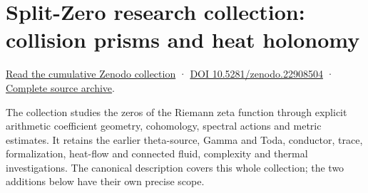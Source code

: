 \documentclass[
]{article}
\author{}
\date{}
\begin{document}
\section{Split-Zero research collection: collision prisms and heat
holonomy}\label{split-zero-research-collection-collision-prisms-and-heat-holonomy}

\href{https://zenodo.org/records/22908504}{Read the cumulative Zenodo
collection} · \href{https://doi.org/10.5281/zenodo.22908504}{DOI
10.5281/zenodo.22908504} ·
\href{https://zenodo.org/records/22908504/files/161-splitzero-prism-holonomy-complete-sources.zip?download=1}{Complete
source archive}.

The collection studies the zeros of the Riemann zeta function through
explicit arithmetic coefficient geometry, cohomology, spectral actions
and metric estimates. It retains the earlier theta-source, Gamma and
Toda, conductor, trace, formalization, heat-flow and connected fluid,
complexity and thermal investigations. The canonical description covers
this whole collection; the two additions below have their own precise
scope.
\end{document}
